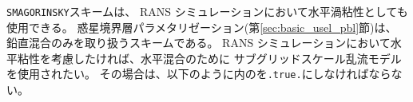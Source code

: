 \verb|SMAGORINSKY|スキームは、 RANS シミュレーションにおいて水平渦粘性としても使用できる。
惑星境界層パラメタリゼーション(第\ref{sec:basic_usel_pbl}節)は、
鉛直混合のみを取り扱うスキームである。
RANS シミュレーションにおいて水平粘性を考慮したければ、水平混合のために
サブグリッドスケール乱流モデルを使用されたい。
その場合は、以下のように内のを\verb|.true.|にしなければならない。
